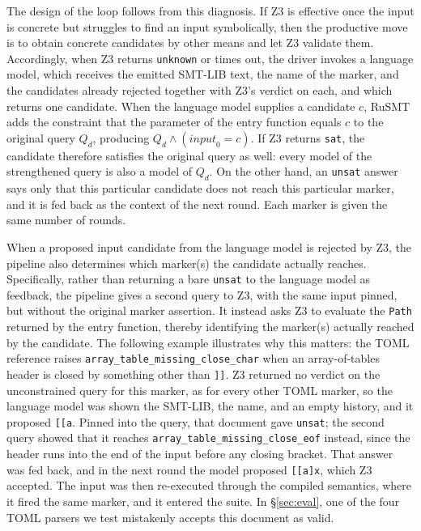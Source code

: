 \documentclass[sigconf,screen]{acmart}
\theoremstyle{definition}
\theoremstyle{remark}
\newcommand{\rusmt}{RuSMT}
\newcommand{\toml}{TOML}
\newcommand{\code}[1]{\texttt{#1}}
\begin{document}
The design of the loop follows from this diagnosis. If Z3 is effective once the input is concrete but struggles to find an input symbolically, then the productive move is to obtain concrete candidates by other means and let Z3 validate them. Accordingly,
when Z3 returns \code{unknown} or times out, the driver invokes a language model,
which receives the emitted SMT-LIB text, the name of the marker, and the
candidates already rejected together with Z3's verdict on each, and which
returns one candidate. When the language model supplies a candidate $c$, \rusmt{} adds the constraint that the parameter of the entry function equals $c$ to the original query $Q_d$, producing $Q_d \wedge (\mathit{input}_0=c)$. If Z3 returns \code{sat}, the candidate therefore satisfies the original query as well: every model of the strengthened query is also a model of $Q_d$. On the other hand, an \code{unsat} answer says
only that this particular candidate does not reach this particular marker, and
it is fed back as the context of the next round. Each marker is given the same
number of rounds.

When a proposed input candidate from the language model is rejected by Z3, the pipeline also determines which marker(s) the candidate actually reaches.
Specifically, rather than returning a bare \code{unsat} to the language model as feedback, the pipeline gives a
second query to Z3, with the same input pinned, but without the original marker assertion. It instead asks Z3 to evaluate the \code{Path} returned by the entry function, thereby identifying the marker(s) actually reached by the candidate. The following example illustrates why this matters: the \toml{} reference raises
\code{array\_table\_missing\_close\_char} when an array-of-tables header is
closed by something other than \code{]]}. Z3 returned no verdict on the
unconstrained query for this marker, as for every other \toml{} marker, so the
language model was shown the SMT-LIB, the name, and an empty history, and it proposed
\code{[[a}. Pinned into the query, that document gave \code{unsat}; the second
query showed that it reaches \code{array\_table\_missing\_close\_eof} instead,
since the header runs into the end of the input before any closing bracket. That
answer was fed back, and in the next round the model proposed \code{[[a]x},
which Z3 accepted. The input was then re-executed through
the compiled semantics, where it fired the same marker, and it entered the
suite. In \S\ref{sec:eval}, one of the four \toml{} parsers we test mistakenly accepts this
document as valid.
\end{document}
